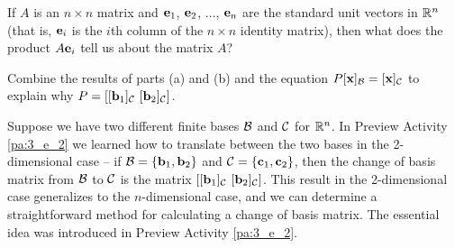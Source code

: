 \begin{pa}
	\item If $A$ is an $n \times n$ matrix and $\mathbf{e}_1$, $\mathbf{e}_2$, $\ldots$, $\mathbf{e}_n$ are the standard unit vectors in $\mathbb{R}^n$ (that is, $\mathbf{e}_i$ is the $i$th column of the $n \times n$ identity matrix), then what does the product $A \mathbf{e}_i$ tell us about the matrix $A$? 
	
	\item Combine the results of parts (a) and (b) and the equation $P[\mathbf{x}]_{\mathcal{B}} = [\mathbf{x}]_{\mathcal{C}}$ to explain why $P = [[\vb_1]_{\CC} \ [\vb_2]_{\CC}]$. 
	
		\ea
		
\ee

\end{pa}




Suppose we have two different finite bases $\mathcal{B}$ and $\mathcal{C}$ for $\mathbb{R}^n$. In Preview Activity \ref{pa:3_e_2} we learned how to translate between the two bases in the 2-dimensional case -- if $\mathcal{B} = \{\mathbf{b}_1, \mathbf{b}_2\}$ and $\mathcal{C} = \{\mathbf{c}_1, \mathbf{c}_2\}$, then the change of basis matrix from $\mathcal{B}$ to $\mathcal{C}$ is the matrix $[[\mathbf{b}_1]_{\mathcal{C}} \ [\mathbf{b}_2]_{\mathcal{C}}]$. This result in the 2-dimensional case generalizes to the $n$-dimensional case, and we can determine a straightforward method for calculating a change of basis matrix.  The essential idea was introduced in Preview Activity \ref{pa:3_e_2}. 

